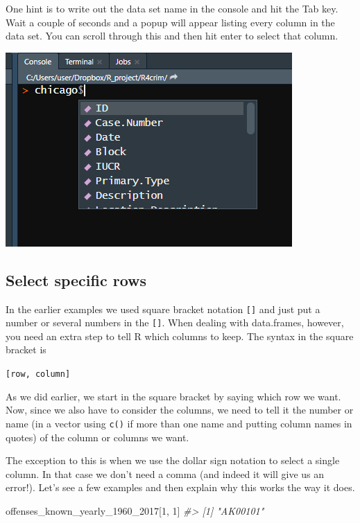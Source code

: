 \documentclass[
]{krantz}
\makeatletter
\newenvironment{Shaded}{\begin{snugshade}}{\end{snugshade}}
\newcommand{\CommentTok}[1]{\textcolor[rgb]{0.37,0.37,0.37}{\textit{#1}}}
\newcommand{\DecValTok}[1]{\textcolor[rgb]{0.06,0.06,0.06}{#1}}
\newcommand{\NormalTok}[1]{#1}
\newenvironment{kframe}{%
\medskip{}
\setlength{\fboxsep}{.8em}
 \def\at@end@of@kframe{}%
 \ifinner\ifhmode%
  \def\at@end@of@kframe{\end{minipage}}%
  \begin{minipage}{\columnwidth}%
 \fi\fi%
 \def\FrameCommand##1{\hskip\@totalleftmargin \hskip-\fboxsep
 \colorbox{shadecolor}{##1}\hskip-\fboxsep
     \hskip-\linewidth \hskip-\@totalleftmargin \hskip\columnwidth}%
 \MakeFramed {\advance\hsize-\width
   \@totalleftmargin\z@ \linewidth\hsize
   \@setminipage}}%
 {\par\unskip\endMakeFramed%
 \at@end@of@kframe}
\renewenvironment{Shaded}{\begin{kframe}}{\end{kframe}}
\makeatother
\begin{document}
One hint is to write out the data set name in the console and hit the Tab key. Wait a couple of seconds and a popup will appear listing every column in the data set. You can scroll through this and then hit enter to select that column.

\includegraphics{images/tab_example.png}

\hypertarget{select-specific-rows}{%
\subsection{Select specific rows}\label{select-specific-rows}}

In the earlier examples we used square bracket notation \texttt{{[}{]}} and just put a number or several numbers in the \texttt{{[}{]}}. When dealing with data.frames, however, you need an extra step to tell R which columns to keep. The syntax in the square bracket is

\texttt{{[}row,\ column{]}}

As we did earlier, we start in the square bracket by saying which row we want. Now, since we also have to consider the columns, we need to tell it the number or name (in a vector using \texttt{c()} if more than one name and putting column names in quotes) of the column or columns we want.

The exception to this is when we use the dollar sign notation to select a single column. In that case we don't need a comma (and indeed it will give us an error!). Let's see a few examples and then explain why this works the way it does.

\begin{Shaded}
\begin{Highlighting}[]
\NormalTok{offenses\_known\_yearly\_1960\_2017[}\DecValTok{1}\NormalTok{, }\DecValTok{1}\NormalTok{]}
\CommentTok{\#\textgreater{} [1] "AK00101"}
\end{Highlighting}
\end{Shaded}
\end{document}
